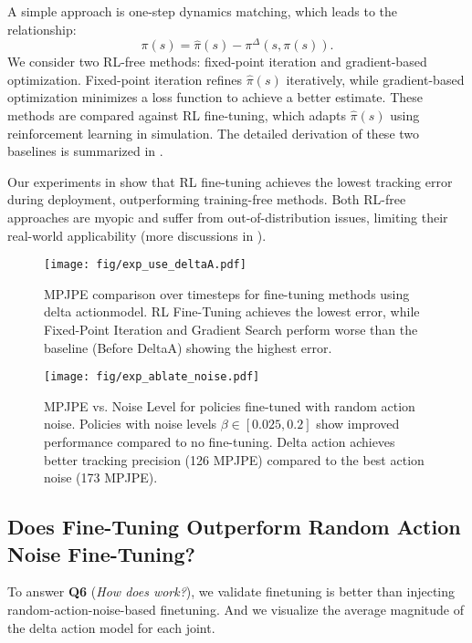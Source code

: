 A simple approach is one-step dynamics matching, which leads to the relationship:
\[
\pi(s) = \hat{\pi}(s) - \pi^\Delta(s, \pi(s)).
\]
We consider two RL-free methods: fixed-point iteration and gradient-based optimization. Fixed-point iteration refines \(\hat\pi(s)\) iteratively, while gradient-based optimization minimizes a loss function to achieve a better estimate. These methods are compared against RL fine-tuning, which adapts \(\hat\pi(s)\) using reinforcement learning in simulation. The detailed derivation of these two baselines is summarized in .

Our experiments in  show that RL fine-tuning achieves the lowest tracking error during deployment, outperforming training-free methods. 
Both RL-free approaches are myopic and suffer from out-of-distribution issues, limiting their real-world applicability (more discussions in ). 




\begin{figure}[htp]
    \centering
    \texttt{[image: fig/exp\_use\_deltaA.pdf]}
    \vspace{-2mm}
    \caption{MPJPE comparison over timesteps for fine-tuning methods using delta actionmodel. RL Fine-Tuning achieves the lowest error, while Fixed-Point Iteration and Gradient Search perform worse than the baseline (Before DeltaA) showing the highest error.}
    \label{fig: use_deltaA}
    \vspace{-4mm}
\end{figure}


\begin{figure}[t]
    \centering
    \texttt{[image: fig/exp\_ablate\_noise.pdf]}
    \vspace{-2mm}
    \caption{MPJPE vs. Noise Level for policies fine-tuned with random action noise. Policies with noise levels $\beta \in [0.025, 0.2]$ show improved performance compared to no fine-tuning. Delta action achieves better tracking precision (126 MPJPE) compared to the best action noise (173 MPJPE).}
    \label{fig:action_noise}
    \vspace{-4mm}
\end{figure}




\subsection{Does \method Fine-Tuning Outperform Random Action Noise Fine-Tuning?}
To answer \textbf{Q6} (\textit{How does \method work?}), we validate \method finetuning is better than injecting random-action-noise-based finetuning. And we visualize the average magnitude of the delta action model for each joint.

